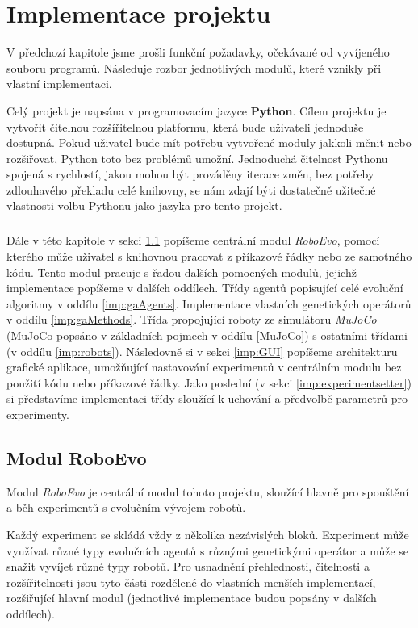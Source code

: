 
\chapter{Implementace projektu}
V předchozí kapitole jsme prošli funkční požadavky, očekávané od vyvíjeného
souboru programů. Následuje rozbor jednotlivých modulů, které vznikly při
vlastní implementaci. 

Celý projekt je napsána v programovacím jazyce \textbf{Python}. Cílem projektu
je vytvořit čitelnou rozšířitelnou platformu, která bude uživateli jednoduše
dostupná. Pokud uživatel bude mít potřebu vytvořené moduly jakkoli měnit nebo
rozšiřovat, Python toto bez problémů umožní. Jednoduchá čitelnost Pythonu
spojená s rychlostí, jakou mohou být prováděny iterace změn, bez potřeby
zdlouhavého překladu celé knihovny, se nám zdají býti dostatečně užitečné
vlastnosti volbu Pythonu jako jazyka pro tento projekt.

\paragraph{}
Dále v této kapitole v sekci \ref{imp:roboevo} popíšeme centrální modul
\emph{RoboEvo}, pomocí kterého může uživatel s knihovnou pracovat z příkazové
řádky nebo ze samotného kódu. Tento modul pracuje s řadou dalších
pomocných modulů, jejichž implementace popíšeme v dalších oddílech. Třídy
agentů popisující celé evoluční algoritmy v oddílu \ref{imp:gaAgents}.
Implementace vlastních genetických operátorů v oddílu \ref{imp:gaMethods}.
Třída propojující roboty ze simulátoru \emph{MuJoCo} (MuJoCo popsáno v
základních pojmech v oddílu \ref{MuJoCo}) s ostatními třídami (v oddílu
\ref{imp:robots}). Následovně si v sekci \ref{imp:GUI} popíšeme architekturu
grafické aplikace, umožňující nastavování experimentů v centrálním modulu bez
použití kódu nebo příkazové řádky. Jako poslední (v sekci
\ref{imp:experimentsetter}) si představíme implementaci třídy sloužící k
uchování a předvolbě parametrů pro experimenty.

\section{Modul RoboEvo} \label{imp:roboevo}
Modul \emph{RoboEvo} je centrální modul tohoto projektu, sloužící hlavně pro
spouštění a běh experimentů s evolučním vývojem robotů. 

Každý experiment se skládá vždy z několika nezávislých bloků. Experiment může
využívat různé typy evolučních agentů s různými genetickými operátor a může se
snažit vyvíjet různé typy robotů. Pro usnadnění přehlednosti, čitelnosti a
rozšířitelnosti jsou tyto části rozdělené do vlastních menších implementací,
rozšiřující hlavní modul (jednotlivé implementace budou popsány v dalších
oddílech). 

